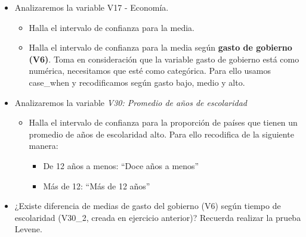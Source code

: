 \documentclass[
]{article}
\begin{document}
\begin{itemize}
\item
  Analizaremos la variable V17 - Economía.

  \begin{itemize}
  \item
    Halla el intervalo de confianza para la media.
  \item
    Halla el intervalo de confianza para la media según \textbf{gasto de
    gobierno (V6)}. Toma en consideración que la variable gasto de
    gobierno está como numérica, necesitamos que esté como categórica.
    Para ello usamos case\_when y recodificamos según gasto bajo, medio
    y alto.
  \end{itemize}
\item
  Analizaremos la variable \emph{V30: Promedio de años de escolaridad}

  \begin{itemize}
  \item
    Halla el intervalo de confianza para la proporción de países que
    tienen un promedio de años de escolaridad alto. Para ello recodifica
    de la siguiente manera:

    \begin{itemize}
    \item
      De 12 años a menos: ``Doce años a menos''
    \item
      Más de 12: ``Más de 12 años''
    \end{itemize}
  \end{itemize}
\item
  ¿Existe diferencia de medias de gasto del gobierno (V6) según tiempo
  de escolaridad (V30\_2, creada en ejercicio anterior)? Recuerda
  realizar la prueba Levene.
\end{itemize}

\hypertarget{section}{%
\subsection{}\label{section}}

\hypertarget{section-1}{%
\subsubsection{}\label{section-1}}
\end{document}
